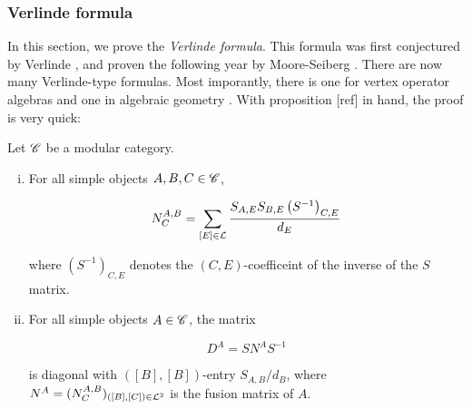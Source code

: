 \subsubsection{Verlinde formula}

In this section, we prove the \textit{Verlinde formula}. This formula was first conjectured by Verlinde \cite{verlinde1988fusion}, and proven the following year by Moore-Seiberg \cite{moore1989classical}. There are now many Verlinde-type formulas. Most imporantly, there is one for vertex operator algebras \cite{huang2008vertex} and one in algebraic geometry \cite{faltings1994proof}. With proposition [ref] in hand, the proof is very quick:

\begin{theorem} Let $\mathscr{C}$ be a modular category.

\begin{enumerate}[(i)]
\item For all simple objects $A,B,C\in \mathscr{C}$,

$$N^{A,B}_C=\sum_{[E]\in \mathcal{L}}\frac{S_{A,E}S_{B,E}\left(S^{-1}\right)_{C,E}}{d_E}$$

where $(S^{-1})_{C,E}$ denotes the $(C,E)$-coefficeint of the inverse of the $S$ matrix.

\item For all simple objects $A\in \mathscr{C}$, the matrix

$$D^A=S N^{A}S^{-1}$$

is diagonal with $([B],[B])$-entry $S_{A,B}/d_B$, where $N^{A}=(N^{A,B}_C)_{([B],[C])\in \mathcal{L}^2}$ is the fusion matrix of $A$.
\end{enumerate}
\end{theorem}
